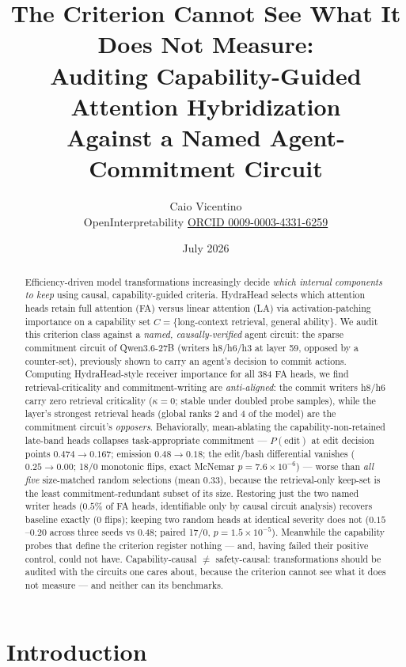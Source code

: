 \documentclass[11pt]{article}
\title{The Criterion Cannot See What It Does Not Measure:\\
Auditing Capability-Guided Attention Hybridization\\
Against a Named Agent-Commitment Circuit}
\author{Caio Vicentino\\
OpenInterpretability \quad \href{https://orcid.org/0009-0003-4331-6259}{ORCID 0009-0003-4331-6259}}
\date{July 2026}
\begin{document}
\maketitle

\begin{abstract}
Efficiency-driven model transformations increasingly decide \emph{which internal components to keep} using
causal, capability-guided criteria. HydraHead \citep{tan2026hydrahead} selects which attention heads retain
full attention (FA) versus linear attention (LA) via activation-patching importance on a capability set
$C=\{$long-context retrieval, general ability$\}$. We audit this criterion class against a \emph{named,
causally-verified} agent circuit: the sparse commitment circuit of Qwen3.6-27B (writers h8/h6/h3 at layer
59, opposed by a counter-set), previously shown to carry an agent's decision to commit actions. Computing
HydraHead-style receiver importance for all 384 FA heads, we find retrieval-criticality and
commitment-writing are \emph{anti-aligned}: the commit writers h8/h6 carry zero retrieval criticality
($\kappa{=}0$; stable under doubled probe samples), while the layer's strongest retrieval heads (global
ranks 2 and 4 of the model) are the commitment circuit's \emph{opposers}. Behaviorally, mean-ablating the
capability-non-retained late-band heads collapses task-appropriate commitment --- $P(\text{edit})$ at edit
decision points $0.474{\to}0.167$; emission $0.48{\to}0.18$; the edit/bash differential vanishes
($0.25{\to}0.00$; 18/0 monotonic flips, exact McNemar $p{=}7.6{\times}10^{-6}$) --- worse than \emph{all
five} size-matched random selections (mean $0.33$), because the retrieval-only keep-set is the least
commitment-redundant subset of its size. Restoring just the two named writer heads ($0.5\%$ of FA heads,
identifiable only by causal circuit analysis) recovers baseline exactly (0 flips); keeping two random heads
at identical severity does not ($0.15$--$0.20$ across three seeds vs $0.48$; paired 17/0,
$p{=}1.5{\times}10^{-5}$). Meanwhile the capability
probes that define the criterion register nothing --- and, having failed their positive control, could
not have. Capability-causal $\neq$ safety-causal: transformations should be audited with the circuits one
cares about, because the criterion cannot see what it does not measure --- and neither can its benchmarks.
\end{abstract}

\section{Introduction}
\end{document}
